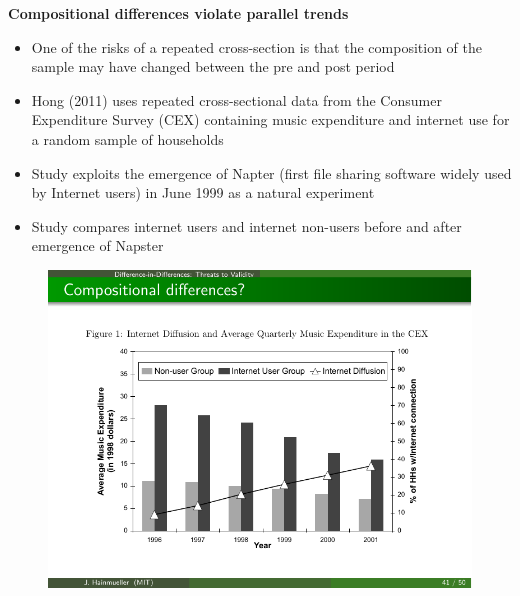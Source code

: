 \documentclass[notes=show]{beamer}
\begin{document}
\begin{frame}[plain]
	\begin{center}
	\textbf{Compositional differences violate parallel trends}
	\end{center}
	
	\begin{itemize}
	\item One of the risks of a repeated cross-section is that the composition of the sample may have changed between the pre and post period
	\item Hong (2011) uses repeated cross-sectional data from the Consumer Expenditure Survey (CEX) containing music expenditure and internet use for a random sample of households
	\item Study exploits the emergence of Napter (first file sharing software widely used by Internet users) in June 1999 as a natural experiment
	\item Study compares internet users and internet non-users before and after emergence of Napster
	\end{itemize}

\end{frame}

\begin{frame}[plain]
	\begin{figure}
	\includegraphics{./lecture_includes/Hong_1.pdf}
	\end{figure}
	
\end{frame}
\end{document}
